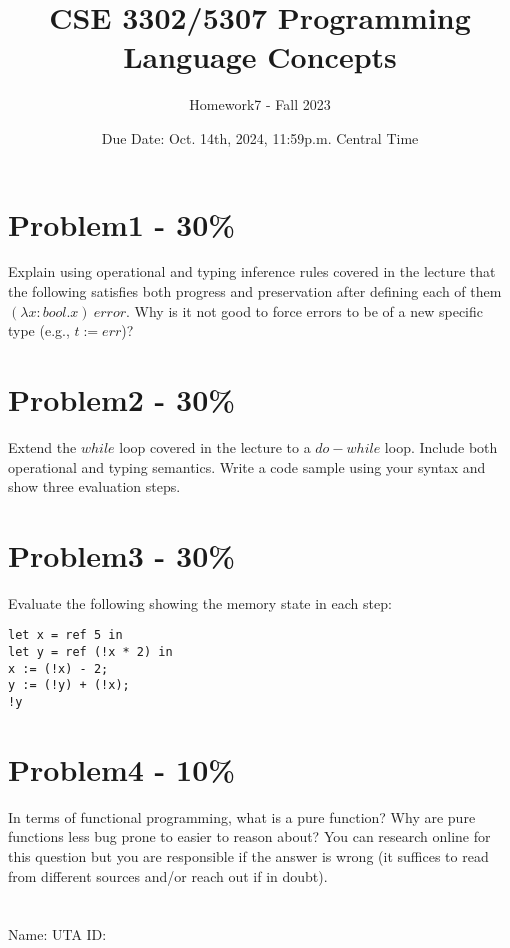 \documentclass{article}
\newcommand{\answerboxbig}{
    \vspace{20cm} %
}
\newcommand{\studentinfo}{
    \noindent Name: \underline{\hspace{5cm}} UTA ID: \underline{\hspace{5cm}}\\
    \vspace{0.5cm} %
}
\begin{document}
\title{CSE 3302/5307 Programming Language Concepts}
\author{Homework7 - Fall 2023}
\date{Due Date: Oct. 14th, 2024, 11:59p.m. Central Time}
\maketitle
\thispagestyle{fancy}


\section*{Problem1 - 30\%}

Explain using operational and typing inference rules covered in the lecture that the following satisfies both progress and preservation after defining each of them $(\lambda x:bool . x) \: error$. Why is it not good to force errors to be of a new specific type (e.g., $t:=err$)?



\newpage 



\section*{Problem2 - 30\%}

Extend the $while$ loop covered in the lecture to a $do-while$ loop. Include both operational and typing semantics. Write a code sample using your syntax and show three evaluation steps.

\newpage 


\section*{Problem3 - 30\%}
Evaluate the following showing the memory state in each step:

\begin{lstlisting}
let x = ref 5 in
let y = ref (!x * 2) in
x := (!x) - 2;
y := (!y) + (!x);
!y
\end{lstlisting}




\section*{Problem4 - 10\%}
In terms of functional programming, what is a pure function? Why are pure functions less bug prone to easier to reason about? You can research online for this question but you are responsible if the answer is wrong (it suffices to read from different sources and/or reach out if in doubt).


\section*{}
\answerboxbig

\studentinfo
\end{document}
